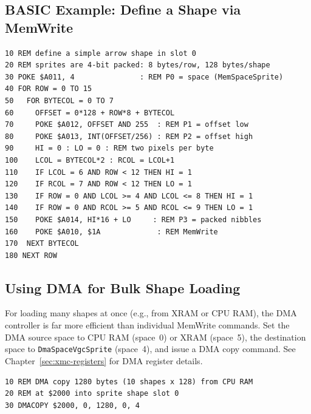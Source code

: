 \subsection{BASIC Example: Define a Shape via MemWrite}

\begin{lstlisting}
10 REM define a simple arrow shape in slot 0
20 REM sprites are 4-bit packed: 8 bytes/row, 128 bytes/shape
30 POKE $A011, 4               : REM P0 = space (MemSpaceSprite)
40 FOR ROW = 0 TO 15
50   FOR BYTECOL = 0 TO 7
60     OFFSET = 0*128 + ROW*8 + BYTECOL
70     POKE $A012, OFFSET AND 255  : REM P1 = offset low
80     POKE $A013, INT(OFFSET/256) : REM P2 = offset high
90     HI = 0 : LO = 0 : REM two pixels per byte
100    LCOL = BYTECOL*2 : RCOL = LCOL+1
110    IF LCOL = 6 AND ROW < 12 THEN HI = 1
120    IF RCOL = 7 AND ROW < 12 THEN LO = 1
130    IF ROW = 0 AND LCOL >= 4 AND LCOL <= 8 THEN HI = 1
140    IF ROW = 0 AND RCOL >= 5 AND RCOL <= 9 THEN LO = 1
150    POKE $A014, HI*16 + LO     : REM P3 = packed nibbles
160    POKE $A010, $1A             : REM MemWrite
170  NEXT BYTECOL
180 NEXT ROW
\end{lstlisting}

\subsection{Using DMA for Bulk Shape Loading}

For loading many shapes at once (e.g., from XRAM or CPU RAM), the DMA controller
is far more efficient than individual MemWrite commands.  Set the DMA source
space to CPU RAM (space~0) or XRAM (space~5), the destination space to
\texttt{DmaSpaceVgcSprite} (space~4), and issue a DMA copy command.  See
Chapter~\ref{sec:xmc-registers} for DMA register details.

\begin{lstlisting}
10 REM DMA copy 1280 bytes (10 shapes x 128) from CPU RAM
20 REM at $2000 into sprite shape slot 0
30 DMACOPY $2000, 0, 1280, 0, 4
\end{lstlisting}
